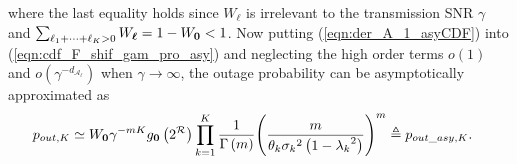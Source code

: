 \documentclass[12pt,onecolumn,draftcls]{IEEEtran}
\newcommand{\bs}{\boldsymbol}
\begin{document}
where the last equality holds since $W_{\bs{\ell}}$ is irrelevant to the transmission SNR $\gamma$ and $\sum\nolimits_{{\ell_1} + \cdots  + {\ell_K} > 0}  {{W_{\bs{\ell}}}} = 1-W_{\bf 0} < 1$. Now putting (\ref{eqn:der_A_1_asyCDF}) into (\ref{eqn:cdf_F_shif_gam_pro_asy}) and neglecting the high order terms $o\left( 1 \right)$ and $o\left( {{\gamma ^{ - {d_{{\mathcal A_{\bs{\ell}}}}}}}} \right)$ when $\gamma \to \infty$, the outage probability can be asymptotically approximated as
%
\begin{align}\label{eqn:der_hat_G_CDF_asy_fur}
{p_{out,K}} %
 &\simeq  {W_{\bf{0}}}{\gamma ^{ - mK}}{g_{\bf{0}}}\left(  2^{\cal R} \right)\prod\limits_{k = 1}^K {\frac{1}{{\Gamma \left( m \right)}}{{\left( {\frac{m}{{{\theta _k}{\sigma _k}^2\left( {1 - {\lambda _k}^2} \right)}}} \right)}^m}} \triangleq {p_{out\_{asy},K}}. %
\end{align}
\end{document}

